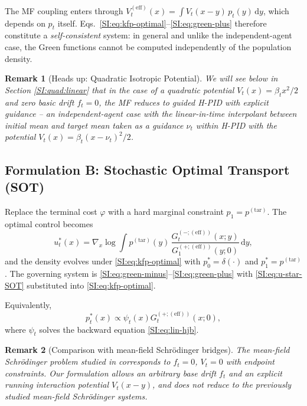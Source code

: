 \documentclass[11pt,onecolumn]{article}
\newcommand{\dd}{\mathrm{d}}
\newcommand{\mfeff}{(\mathrm{eff})}
\newcommand{\ptar}{p^{(\mathrm{tar})}}
\newcommand{\Veff}{V^{(\mathrm{eff})}}
\newtheorem{remark}{Remark}[section]
\begin{document}
The MF coupling enters through $\Veff_t(x) = \int V_t(x-y)\,p_t(y)\,\dd y$, which depends on $p_t$ itself. Eqs.~\eqref{SI:eq:kfp-optimal}--\eqref{SI:eq:green-plus} therefore constitute a \emph{self-consistent} system: in general and unlike the independent-agent case, the Green functions cannot be computed independently of the population density. 

\begin{remark}[Heads up: Quadratic Isotropic Potential] We will see below in Section \ref{SI:quad:linear} that in the case of a quadratic potential $V_t(x)=\beta_t x^2/2$ and zero basic drift $f_t=0$, the MF reduces to guided H-PID with explicit guidance -- an independent-agent case with the linear-in-time interpolant between initial mean and target mean taken as a guidance $\nu_t$ within H-PID with the potential $V_t(x)=\beta_t (x-\nu_t)^2/2$.
\end{remark}

\subsection{Formulation B: Stochastic Optimal Transport (SOT)}
\label{SI:theory:sot}

Replace the terminal cost $\varphi$ with a hard marginal constraint
$p_1 = \ptar$.
The optimal control becomes
\begin{equation}
  u_t^*(x)
  = \nabla_x\log\int\!\!\ptar(y)\,
      \frac{G_t^{(-;\mfeff)}(x;y)}{G_1^{(+;\mfeff)}(y;0)}\,\dd y,
  \label{SI:eq:u-star-SOT}
\end{equation}
and the density evolves under \eqref{SI:eq:kfp-optimal} with $p_0^*=\delta(\cdot)$ and $p_1^*=\ptar$. The governing system is \eqref{SI:eq:green-minus}--\eqref{SI:eq:green-plus} with \eqref{SI:eq:u-star-SOT} substituted into \eqref{SI:eq:kfp-optimal}.

Equivalently, $$p_t^*(x)\propto \psi_t(x) G_t^{(+;\mfeff)}(x;0),$$ where $\psi_t$ solves the backward equation \eqref{SI:eq:lin-hjb}.

\begin{remark}[Comparison with mean-field Schr\"odinger bridges]
The mean-field Schr\"odinger problem studied in \cite{backhoff-veraguas_adapted_2020,hernandez_propagation_2024} corresponds to
$f_t=0$, $V_t=0$ with endpoint constraints.
Our formulation allows an arbitrary base drift $f_t$ and an explicit
running interaction potential $V_t(x-y)$, and does not reduce to the
previously studied mean-field Schr\"odinger systems.
\end{remark}
\end{document}
